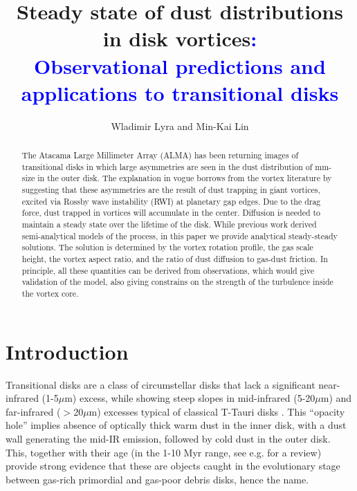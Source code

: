 \documentclass[apj]{emulateapj}
\def\blue#1{\textcolor{blue}{#1}}
\begin{document}
\title{Steady state of dust distributions in disk vortices{\blue:}\\
\blue{Observational predictions and applications to transitional disks}}
\author{Wladimir Lyra and Min-Kai Lin}

\begin{abstract}
The Atacama Large Millimeter Array (ALMA) has been  returning images of transitional disks in which large asymmetries are seen in the dust distribution of 
mm-size in the outer disk. The explanation in vogue borrows from the vortex literature by suggesting 
that these asymmetries are the result of dust trapping in giant vortices, excited via Rossby wave instability (RWI) 
at planetary gap edges. Due to the drag force, dust trapped in vortices will accumulate 
in the center. Diffusion is needed to maintain a steady state over the lifetime of the disk. While previous work 
derived semi-analytical models of the process, in this paper we
provide analytical steady-steady solutions. The solution is determined by the vortex rotation profile, the gas scale height, the 
vortex aspect ratio, and the ratio of dust diffusion to gas-dust friction. In principle, all these quantities can be derived
from observations, which would give validation of the model, also giving constrains on the strength of the turbulence 
inside the vortex core.
\end{abstract}

\section{Introduction}
\label{sect:introduction}

Transitional disks are a class of circumstellar disks that lack a
significant near-infrared (1-5$\mu$m) excess, while showing steep
slopes in mid-infrared (5-20$\mu$m) and
far-infrared ($>$20$\mu$m) excesses typical of classical T-Tauri disks
\citep{Strom89,Skrutskie90,Gauvin-Strom92,Wolk-Walter96,Calvet02,Calvet05,Muzerolle06,Sicilia06,Currie09,Currie-Sicilia11}. 
This ``opacity hole''  implies absence of optically thick warm dust in the inner disk, with a dust
wall generating the mid-IR emission, followed by cold dust in the
outer disk.  This, together with their age (in the 1-10 Myr range, see
e.g. \citealt{Currie10} for a review) provide strong evidence that these are
objects caught in the evolutionary stage between gas-rich 
primordial and gas-poor debris disks, hence the name. 
\end{document}
